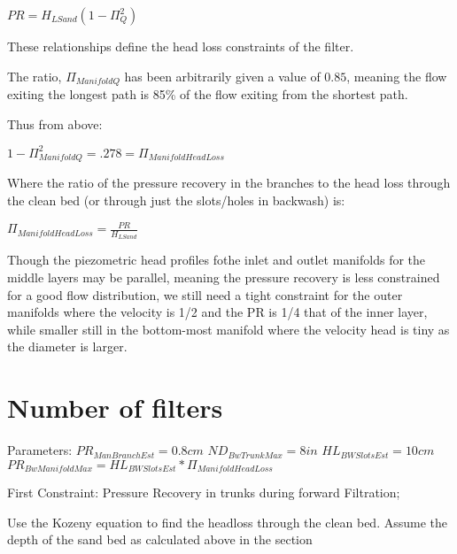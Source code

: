\documentclass[letterpaper,10pt,english]{sphinxmanual}
\begin{document}
\(PR = H_{LSand}(1- \Pi_Q^2)\)

These relationships define the head loss constraints of the filter.

The ratio, \(\Pi_{ManifoldQ}\) has been arbitrarily given a value of \(0.85\), meaning the flow exiting the longest path is 85\% of the flow exiting from the shortest path.

Thus from above:

\(1 - \Pi_{ManifoldQ}^2 = .278 = \Pi_{ManifoldHeadLoss}\)

Where the ratio of the pressure recovery in the branches to the head loss through the clean bed (or through just the slots/holes in backwash) is:

\(\Pi_{ManifoldHeadLoss} = \frac{PR}{H_{LSand}}\)

Though the piezometric head profiles fothe inlet and outlet manifolds for the middle layers may be parallel, meaning the pressure recovery is less constrained for a good flow distribution, we still need a tight constraint for the outer manifolds where the velocity is 1/2 and the PR is 1/4 that of the inner layer, while smaller still in the bottom-most manifold where the velocity head is tiny as the diameter is larger.


\section{Number of filters}
\label{\detokenize{Filtration/Filtration_Derivations:number-of-filters}}\label{\detokenize{Filtration/Filtration_Derivations:heading-n-filter}}
Parameters:
\(PR_{ManBranchEst} = 0.8cm\)
\(ND_{BwTrunkMax} = 8in\)
\(HL_{BWSlotsEst}= 10cm\)
\(PR_{BwManifoldMax} = HL_{BWSlotsEst}*\Pi_{ManifoldHeadLoss}\)


First Constraint: Pressure Recovery in trunks during forward Filtration;

Use the Kozeny equation to find the headloss through the clean bed. Assume the depth of the sand bed as calculated above in the  section
\end{document}
